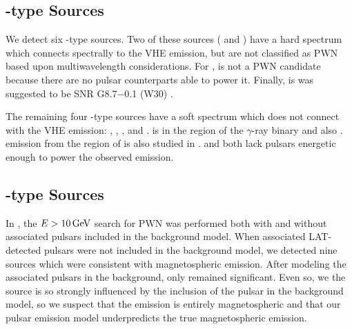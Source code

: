 \subsection{\OtherClass-type Sources}

We detect six \OtherClass-type sources.  Two of these sources
( and ) have a hard spectrum which connects
spectrally to the \ac{VHE} emission, but are not classified as \ac{PWN}
based upon multiwavelength considerations.  For , is not
a \ac{PWN} candidate because there are no pulsar counterparts able to
power it.  Finally,  is was suggested to be SNR G8.7$-$0.1
(W30) \citep{ajello_2012a_fermi-large}.

The remaining four \OtherClass-type sources have a soft spectrum
which does not connect with the \ac{VHE} emission: ,
, , and .  
is in the region of the $\gamma$-ray binary 
\citep{the-fermi-lat-collaboration_2012a_periodic-emission} and also
.  \gev emission from the region of  is also
studied in \cite{domainko_2012a_exploring-nature}.   and
 both lack pulsars energetic enough to power the observed
emission.

\subsection{\PSRClass-type Sources}

In \citep{acero_2013a_constraints-galactic}, the
$E>10\,\text{GeV}$ search for \ac{PWN} was performed both with
and without associated pulsars included in the background model.  When
associated \ac{LAT}-detected pulsars were not included in the background
model, we detected nine sources which were consistent with magnetospheric
emission.  After modeling the associated pulsars in the background, only
 remained significant.  Even so, we the source is so strongly
influenced by the inclusion of the pulsar in the background model, so
we suspect that the emission is entirely magnetospheric and that our
pulsar emission model underpredicts the true magnetospheric emission.
